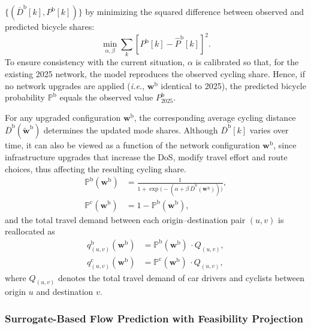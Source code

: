 \documentclass[lettersize,journal]{IEEEtran}
\begin{document}
$ \{(\overline{D}^\mathrm{b}[k], P^\mathrm{b}[k])\} $ by minimizing the squared difference between 
observed and predicted bicycle shares:
\begin{equation}
    \min_{\alpha,\beta} 
    \sum_{k}
    \left[
        P^\mathrm{b}[k] - \widehat{P}^\mathrm{b}[k]
    \right]^2.
\end{equation}
To ensure consistency with the current situation, $ \alpha $ is calibrated so that,
for the existing 2025 network, the model reproduces the observed cycling share.
Hence, if no network upgrades are applied 
(\emph{i.e.}, $\boldsymbol{w}^\mathrm{b} $ identical to 2025),
the predicted bicycle probability $ \mathbb{P}^\mathrm{b} $ equals the observed value
$ P^\mathrm{b}_{\mathrm{2025}} $.

For any upgraded configuration $\boldsymbol{w}^\mathrm{b} $, 
the corresponding average cycling distance 
$ \overline{D}^\mathrm{b}(\tilde{\boldsymbol{w}}^\mathrm{b}) $ 
determines the updated mode shares. 
Although $ \overline{D}^\mathrm{b}[k] $ varies over time, it can also be viewed as a function 
of the network configuration $ \boldsymbol{w}^\mathrm{b} $, 
since infrastructure upgrades that increase the DoS, modify travel 
effort and route choices, thus affecting the resulting cycling share.
\begin{align}
    \mathbb{P}^\mathrm{b}(\boldsymbol{w}^\mathrm{b})
        &= \frac{1}{1 + \exp\!\big(-(\alpha + \beta\,\overline{D}^\mathrm{b}(\boldsymbol{w}^\mathrm{b}))\big)},\\[2pt]
    \mathbb{P}^\mathrm{c}(\boldsymbol{w}^\mathrm{b})
        &= 1 - \mathbb{P}^\mathrm{b}(\boldsymbol{w}^\mathrm{b}),
\end{align}
and the total travel demand between each origin–destination pair $ (u,v) $ 
is reallocated as
\begin{align}
\label{eq:mode_shift}
    q_{(u,v)}^\mathrm{b}(\boldsymbol{w}^\mathrm{b})
        &= \mathbb{P}^\mathrm{b}(\boldsymbol{w}^\mathrm{b})\, \cdot Q_{(u,v)},\\[2pt]
    q_{(u,v)}^\mathrm{c}(\boldsymbol{w}^\mathrm{b})
        &= \mathbb{P}^\mathrm{c}(\boldsymbol{w}^\mathrm{b})\, \cdot Q_{(u,v)},
\end{align}
where $ Q_{(u,v)} $ denotes the total travel demand of car drivers and cyclists between origin $ u $ 
and destination $ v $.


\subsubsection{Surrogate-Based Flow Prediction with Feasibility Projection}
\label{subsec:gcn_surrogate}
\end{document}

